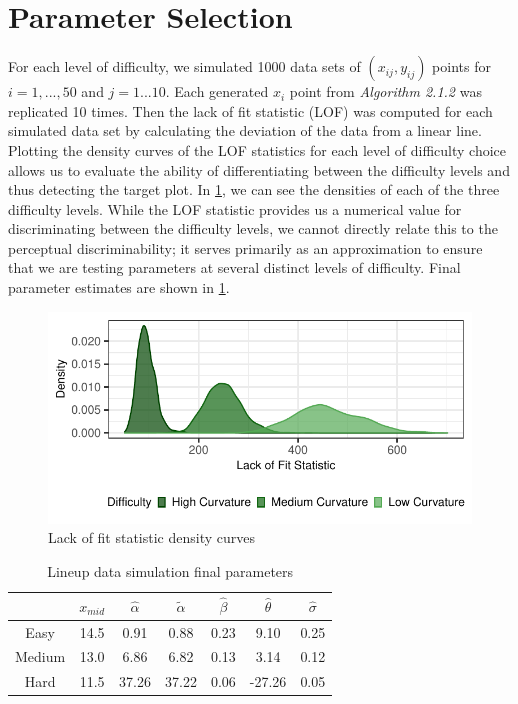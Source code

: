\documentclass[print]{nuthesis}
\begin{document}
\hypertarget{parameter-selection}{%
\section{Parameter Selection}\label{parameter-selection}}

For each level of difficulty, we simulated 1000 data sets of \((x_{ij}, y_{ij})\) points for \(i = 1,...,50\) and \(j = 1...10\).
Each generated \(x_i\) point from \textit{Algorithm 2.1.2} was replicated 10 times.
Then the lack of fit statistic (LOF) was computed for each simulated data set by calculating the deviation of the data from a linear line.
Plotting the density curves of the LOF statistics for each level of difficulty choice allows us to evaluate the ability of differentiating between the difficulty levels and thus detecting the target plot.
In \cref{fig:lof-density-curves}, we can see the densities of each of the three difficulty levels.
While the LOF statistic provides us a numerical value for discriminating between the difficulty levels, we cannot directly relate this to the perceptual discriminability; it serves primarily as an approximation to ensure that we are testing parameters at several distinct levels of difficulty.
Final parameter estimates are shown in \cref{tab:parameter-data}.

\begin{figure}[tbp]

{\centering \includegraphics[width=\linewidth,]{thesis_files/figure-latex/lof-density-curves-1} 

}

\caption{Lack of fit statistic density curves}\label{fig:lof-density-curves}
\end{figure}

\begin{table}

\caption{\label{tab:parameter-data}Lineup data simulation final parameters}
\centering
\begin{tabular}[t]{ccccccc}
\toprule
 & $x_{mid}$ & $\hat\alpha$ & $\tilde\alpha$ & $\hat\beta$ & $\hat\theta$ & $\hat\sigma$\\
\midrule
Easy & 14.5 & 0.91 & 0.88 & 0.23 & 9.10 & 0.25\\
Medium & 13.0 & 6.86 & 6.82 & 0.13 & 3.14 & 0.12\\
Hard & 11.5 & 37.26 & 37.22 & 0.06 & -27.26 & 0.05\\
\bottomrule
\end{tabular}
\end{table}
\end{document}

